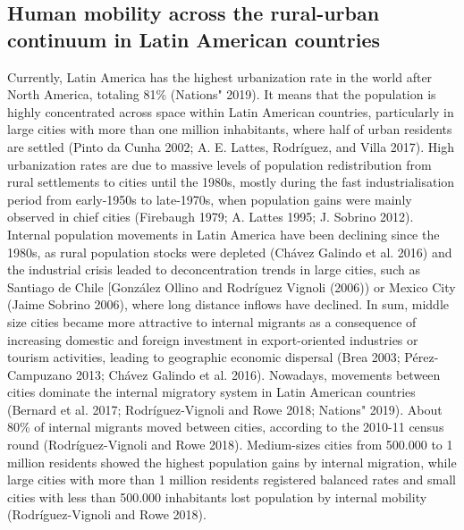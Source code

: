 \documentclass[
  10pt,
  letterpaper,
  DIV=11,
  numbers=noendperiod]{scrartcl}
\begin{document}
\hypertarget{human-mobility-across-the-rural-urban-continuum-in-latin-american-countries}{%
\subsection{Human mobility across the rural-urban continuum in Latin
American
countries}\label{human-mobility-across-the-rural-urban-continuum-in-latin-american-countries}}

Currently, Latin America has the highest urbanization rate in the world
after North America, totaling 81\% (Nations" 2019). It means that the
population is highly concentrated across space within Latin American
countries, particularly in large cities with more than one million
inhabitants, where half of urban residents are settled (Pinto da Cunha
2002; A. E. Lattes, Rodríguez, and Villa 2017). High urbanization rates
are due to massive levels of population redistribution from rural
settlements to cities until the 1980s, mostly during the fast
industrialisation period from early-1950s to late-1970s, when population
gains were mainly observed in chief cities (Firebaugh 1979; A. Lattes
1995; J. Sobrino 2012). Internal population movements in Latin America
have been declining since the 1980s, as rural population stocks were
depleted (Chávez Galindo et al. 2016) and the industrial crisis leaded
to deconcentration trends in large cities, such as Santiago de Chile
{[}González Ollino and Rodríguez Vignoli (2006)) or Mexico City (Jaime
Sobrino 2006), where long distance inflows have declined. In sum, middle
size cities became more attractive to internal migrants as a consequence
of increasing domestic and foreign investment in export-oriented
industries or tourism activities, leading to geographic economic
dispersal (Brea 2003; Pérez-Campuzano 2013; Chávez Galindo et al. 2016).
Nowadays, movements between cities dominate the internal migratory
system in Latin American countries (Bernard et al. 2017;
Rodríguez-Vignoli and Rowe 2018; Nations" 2019). About 80\% of internal
migrants moved between cities, according to the 2010-11 census round
(Rodríguez-Vignoli and Rowe 2018). Medium-sizes cities from 500.000 to 1
million residents showed the highest population gains by internal
migration, while large cities with more than 1 million residents
registered balanced rates and small cities with less than 500.000
inhabitants lost population by internal mobility (Rodríguez-Vignoli and
Rowe 2018).
\end{document}
